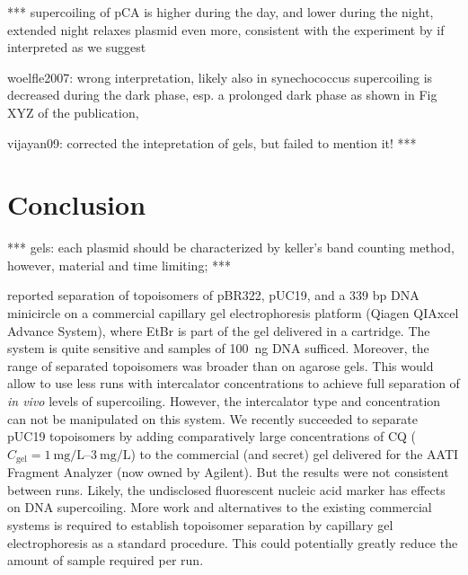 \documentclass[10pt,a4]{article}
\def\cite#1{\hypersetup{citecolor=Teal}\citep{#1}} %
\newcommand{\cqgel}{\ensuremath{C_{\text{gel}}}}
\newcommand{\TODO}[1]{\begingroup\color{red}*** #1 ***\endgroup}
\begin{document}
\TODO{
    supercoiling of pCA is higher during the day, and lower during the
  night, extended night relaxes plasmid even more, consistent
  with the experiment by \cite{Woelfle2007} if interpreted
  as we suggest
  
  woelfle2007: wrong interpretation, likely also in synechococcus
  supercoiling is decreased during the dark phase, esp. a prolonged
  dark phase as shown in Fig XYZ of the publication,
  
  
  vijayan09: corrected the intepretation of gels, but failed to mention
  it!
}

\section{Conclusion}

\TODO{
 gels: each plasmid should be characterized by keller's band counting
  method, however, material and time limiting;
}

\citet{Mitchenall2018} reported separation of topoisomers of pBR322,
pUC19, and a 339 bp DNA minicircle on a commercial capillary gel
electrophoresis platform (Qiagen QIAxcel Advance System), where EtBr
is part of the gel delivered in a cartridge. The system is quite
sensitive and samples of \SI{100}{\ng} DNA sufficed. Moreover, the
range of separated topoisomers was broader than on agarose gels. This
would allow to use less runs with intercalator concentrations to
achieve full separation of \textit{in vivo} levels of supercoiling.
However, the intercalator type and concentration can not be
manipulated on this system. We recently succeeded to separate pUC19
topoisomers by adding comparatively large concentrations of CQ
($\cqgel=\SIrange{1}{3}{\milli\gram\per\liter}$) to the commercial
(and secret) gel delivered for the AATI Fragment Analyzer (now owned
by Agilent). But the results were not consistent between runs. Likely,
the undisclosed fluorescent nucleic acid marker has effects on DNA
supercoiling. More work and alternatives to the existing commercial
systems is required to establish topoisomer separation by capillary
gel electrophoresis as a standard procedure. This could potentially
greatly reduce the amount of sample required per run.
\end{document}
